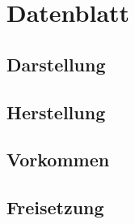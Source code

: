 \section{Datenblatt}
\subsection{Darstellung}
\subsection{Herstellung}
\subsection{Vorkommen}
\subsection{Freisetzung}
